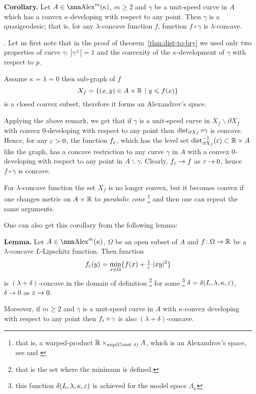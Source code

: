 \documentclass{article}
\begin{document}
\begin{thm}{\bf Corollary.} \label{cor:eq-qg}
Let $A\in\Alex^m(\kappa)$, $m\ge2$ and $\gamma$ be a unit-speed curve in $A$
which has a convex $\kappa$-developing with respect to any point.
Then $\gamma$ is a quasigeodesic;
that is, for any $\lambda$-concave function $f$,
function $f\circ\gamma$ is $\lambda$-concave.
\end{thm}

\Proof.  Let us first note that in the proof of theorem~\ref{thm:dist-to-bry} we
used only two properties of curve $\gamma$:
$|\gamma^\pm|=1$ and the convexity of the $\kappa$-development of $\gamma$ with respect
to $p$.

Assume $\kappa=\lambda=0$ then sub-graph of $f$
$$X_f=\{(x,y)\in A\times\mathbb{R}\ |\ y\leqslant f(x)\}$$ 
is a closed convex subset, therefore it forms an Alexandrov's space.

Applying the above remark, we get that if $\gamma$ is a unit-speed curve in
$X_f\backslash \partial X_f$ with convex $0$-developing with respect to any
point then $\operatorname{dist}_{\partial X_f}\circ\gamma$ is concave.
 Hence, for any $\varepsilon>0$, the function $f_\varepsilon$, which has the level set $\operatorname{dist}_{\partial X_f}^{-1}(\varepsilon)\subset \mathbb{R}\times A$ like the graph, has a concave restriction to any curve $\gamma$ in
$A$ with a convex $0$-developing with respect to any
point in $A\backslash\gamma$. 
Clearly, $f_\varepsilon\to f$ as $\varepsilon\to 0$, hence $f\circ\gamma$ is concave. 

For $\lambda$-concave function the set $X_f$ is no longer convex, but it becomes convex if one changes metric on $A\times\mathbb{R}$ to \emph{parabolic cone}%
\footnote{\label{par-cone} that is, a warped-product
$\mathbb{R}\times_{\exp(\operatorname{Const}{\cdot}t)} A$, which is an Alexandrov's space, see \cite[4.3.3]{BGP} and \cite{alexander-bishop:worps}} 
and then one can repeat the same arguments.\qeds


 One can also get this corollary from the following lemma:

\begin{thm}{\bf Lemma.}\label{f_eps}
Let $A\in\Alex^m(\kappa)$, $\Omega$ be an open subset of $A$ and
 $f\colon\Omega\to\mathbb{R}$ be a $\lambda$-concave $L$-Lipschitz function.
Then function
$$f_\varepsilon(y)=\min_{x\in\Omega}\{f(x)+\tfrac1{\varepsilon}{\cdot}|x y|^2\}$$
is $(\lambda+\delta)$-concave in the domain of definition%
\footnote{that is the set where the minimum is defined.} 
for some%
\footnote{this function $\delta(L,\lambda,\kappa,\varepsilon)$ is achieved for the model space $\Lambda_\kappa$} 
$\delta=\delta(L,\lambda,\kappa,\varepsilon)$, $\delta\to0$ as $\varepsilon\to 0$.

Moreover, if $m\ge 2$ and $\gamma$ is a unit-speed curve in $A$ with $\kappa$-convex developing with respect to any point then 
$f_\varepsilon\circ\gamma$ is also $(\lambda+\delta)$-concave.
\end{thm}
\end{document}
